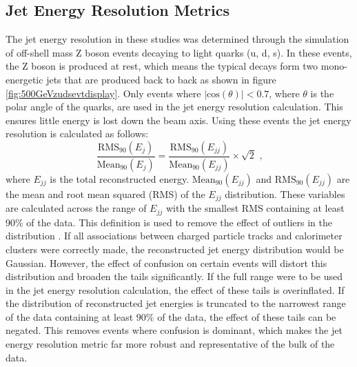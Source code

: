 \subsection{Jet Energy Resolution Metrics}
The jet energy resolution in these studies was determined through the simulation of off-shell mass Z boson events decaying to light quarks (u, d, s).  In these events, the Z boson is produced at rest, which means the typical decays form two mono-energetic jets that are produced back to back as shown in figure \ref{fig:500GeVzudsevtdisplay}.  Only events where $|\text{cos}(\theta)| < 0.7$, where $\theta$ is the polar angle of the quarks, are used in the jet energy resolution calculation.  This ensures little energy is lost down the beam axis.  Using these events the jet energy resolution is calculated as follows: 
\begin{equation} 
\frac{\text{RMS}_{90}(E_{j})}{\text{Mean}_{90}(E_{j})} = \frac{\text{RMS}_{90}(E_{jj})}{\text{Mean}_{90}(E_{jj})} \times \sqrt{2} \text{ ,}
\end{equation}
\noindent where $E_{jj}$ is the total reconstructed energy.  $\text{Mean}_{90}(E_{jj})$ and $\text{RMS}_{90}(E_{jj})$ are the mean and root mean squared (RMS) of the $E_{jj}$ distribution.  These variables are calculated across the range of $E_{jj}$ with the smallest RMS containing at least 90\% of the data.  This definition is used to remove the effect of outliers in the distribution \cite{arXiv:0907.3577}.  If all associations between charged particle tracks and calorimeter clusters were correctly made, the reconstructed jet energy distribution would be Gaussian.  However, the effect of confusion on certain events will distort this distribution and broaden the tails significantly.  If the full range were to be used in the jet energy resolution calculation, the effect of these tails is overinflated.  If the distribution of reconstructed jet energies is truncated to the narrowest range of the data containing at least $90\%$ of the data, the effect of these tails can be negated.  This removes events where confusion is dominant, which makes the jet energy resolution metric far more robust and representative of the bulk of the data.  

